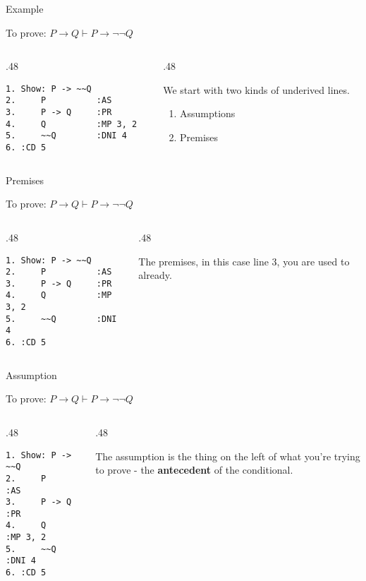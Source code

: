\documentclass[
  ignorenonframetext,
]{beamer}
\providecommand{\tightlist}{%
  \setlength{\itemsep}{0pt}\setlength{\parskip}{0pt}}
\renewcommand{\,}{\text{, }}
\def\begincols{\begin{columns}}
\def\begincol{\begin{column}}
\def\endcol{\end{column}}
\def\endcols{\end{columns}}
\begin{document}
\begin{frame}[fragile]{Example}
\protect\hypertarget{example-1}{}

To prove: \(P \rightarrow Q \vdash P \rightarrow \neg \neg Q\)

\bigskip

\begincols
\begincol{.48\textwidth}

\begin{verbatim}
1. Show: P -> ~~Q
2.     P          :AS
3.     P -> Q     :PR
4.     Q          :MP 3, 2
5.     ~~Q        :DNI 4
6. :CD 5
\end{verbatim}

\endcol
\begincol{.48\textwidth}

We start with two kinds of underived lines.

\begin{enumerate}
\tightlist
\item
  Assumptions
\item
  Premises
\end{enumerate}

\endcol
\endcols

\end{frame}

\begin{frame}[fragile]{Premises}
\protect\hypertarget{premises}{}

To prove: \(P \rightarrow Q \vdash P \rightarrow \neg \neg Q\)

\bigskip
\begincols
\begincol{.48\textwidth}

\begin{verbatim}
1. Show: P -> ~~Q
2.     P          :AS
3.     P -> Q     :PR
4.     Q          :MP 3, 2
5.     ~~Q        :DNI 4
6. :CD 5
\end{verbatim}

\endcol
\begincol{.48\textwidth}

The premises, in this case line 3, you are used to already.

\endcol
\endcols

\end{frame}

\begin{frame}[fragile]{Assumption}
\protect\hypertarget{assumption}{}

To prove: \(P \rightarrow Q \vdash P \rightarrow \neg \neg Q\)

\bigskip

\begincols
\begincol{.48\textwidth}

\begin{verbatim}
1. Show: P -> ~~Q
2.     P          :AS
3.     P -> Q     :PR
4.     Q          :MP 3, 2
5.     ~~Q        :DNI 4
6. :CD 5
\end{verbatim}

\endcol
\begincol{.48\textwidth}

The assumption is the thing on the left of what you're trying to prove -
the \textbf{antecedent} of the conditional.

\endcol
\endcols

\end{frame}
\end{document}
